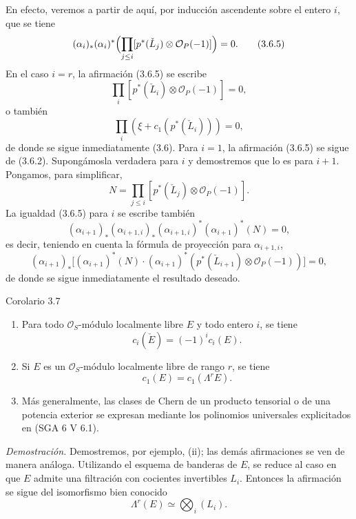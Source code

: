 En efecto, veremos a partir de aquí, por inducción ascendente sobre el entero $i$, que se tiene
\[
(\alpha_i)_*(\alpha_i)^*\Bigl(\prod_{j\le i}[p^*(\check L_j)\otimes\mathcal O_P(-1)]\Bigr)=0.
\tag{3.6.5}
\]
En el caso $i=r$, la afirmación (3.6.5) se escribe
\[
\prod_i[p^*(\check L_i)\otimes\mathcal O_P(-1)]=0,
\]
o también
\[
\prod_i(\xi+c_1(p^*(\check L_i)))=0,
\]
de donde se sigue inmediatamente (3.6). Para $i=1$, la afirmación (3.6.5) se sigue de (3.6.2). Supongámosla verdadera para $i$ y demostremos que lo es para $i+1$. Pongamos, para simplificar,
\[
N=\prod_{j\le i}[p^*(\check L_j)\otimes\mathcal O_P(-1)].
\]
La igualdad (3.6.5) para $i$ se escribe también
\[
(\alpha_{i+1})_*(\alpha_{i+1,i})_*(\alpha_{i+1,i})^*(\alpha_{i+1})^*(N)=0,
\]
es decir, teniendo en cuenta la fórmula de proyección para $\alpha_{i+1,i}$,
\[
(\alpha_{i+1})_*\bigl[(\alpha_{i+1})^*(N)\cdot(\alpha_{i+1})^*(p^*(\check L_{i+1})\otimes\mathcal O_P(-1))\bigr]=0,
\]
de donde se sigue inmediatamente el resultado deseado.

\begin{statement}{Corolario 3.7}
\begin{enumerate}[label=(\roman*)]
\item Para todo $\mathcal O_S$-módulo localmente libre $E$ y todo entero $i$, se tiene
\[
c_i(\check E)=(-1)^i c_i(E).
\]
\item Si $E$ es un $\mathcal O_S$-módulo localmente libre de rango $r$, se tiene
\[
c_1(E)=c_1(\Lambda^rE).
\]
\item Más generalmente, las clases de Chern de un producto tensorial o de una potencia exterior se expresan mediante los polinomios universales explicitados en (SGA 6 V 6.1).
\end{enumerate}
\end{statement}

\emph{Demostración.} Demostremos, por ejemplo, (ii); las demás afirmaciones se ven de manera análoga. Utilizando el esquema de banderas de $E$, se reduce al caso en que $E$ admite una filtración con cocientes invertibles $L_i$. Entonces la afirmación se sigue del isomorfismo bien conocido
\[
\Lambda^r(E)\simeq\bigotimes_i (L_i).
\]
